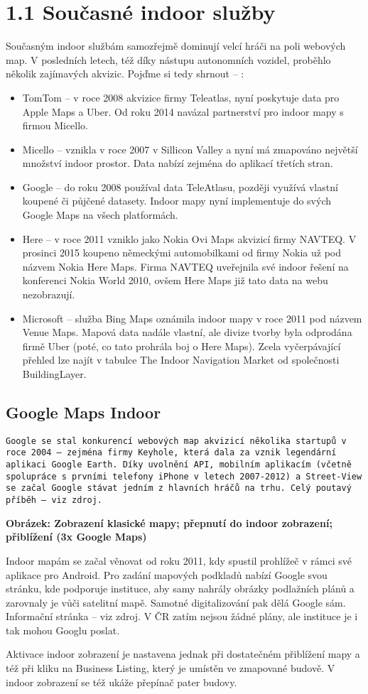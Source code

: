 \section{1.1 Současné indoor služby}
Současným indoor službám samozřejmě dominují velcí hráči na poli webových map. V posledních letech, též díky nástupu autonomních vozidel, proběhlo několik zajímavých akvizic. Pojďme si tedy shrnout – :
\begin{itemize}
\item TomTom – v roce 2008 akvizice firmy Teleatlas, nyní poskytuje data pro Apple Maps a Uber. Od roku 2014 navázal partnerství pro indoor mapy s firmou Micello. 
\item Micello – vznikla v roce 2007 v Sillicon Valley a nyní má zmapováno největší množství indoor prostor. Data nabízí zejména do aplikací třetích stran.
\item Google – do roku 2008 používal data TeleAtlasu, později využívá vlastní koupené či půjčené datasety. Indoor mapy nyní implementuje do svých Google Maps na všech platformách.
\item Here – v roce 2011 vzniklo jako Nokia Ovi Maps akvizicí firmy NAVTEQ. V prosinci 2015 koupeno německými automobilkami od firmy Nokia už pod názvem Nokia Here Maps. Firma NAVTEQ uveřejnila své indoor řešení na konferenci Nokia World 2010, ovšem Here Maps již tato data na webu nezobrazují. 
\item Microsoft – služba Bing Maps oznámila indoor mapy v roce 2011 pod názvem Venue Maps. Mapová data nadále vlastní, ale divize tvorby byla odprodána firmě Uber (poté, co tato prohrála boj o Here Maps).
Zcela vyčerpávající přehled lze najít v tabulce The Indoor Navigation Market od společnosti BuildingLayer.
\end{itemize}

\subsection*{Google Maps Indoor}
\texttt{Google se stal konkurencí webových map akvizicí několika startupů v roce 2004 – zejména firmy Keyhole, která dala za vznik legendární aplikaci Google Earth. Díky uvolnění API, mobilním aplikacím (včetně spolupráce s prvními telefony iPhone v letech 2007-2012) a Street-View se začal Google stávat jedním z hlavních hráčů na trhu. Celý poutavý příběh – viz zdroj.}


\textbf{Obrázek: Zobrazení klasické mapy; přepnutí do indoor zobrazení; přiblížení (3x Google Maps)}

Indoor mapám se začal věnovat od roku 2011, kdy spustil prohlížeč v rámci své aplikace pro Android. Pro zadání mapových podkladů nabízí Google svou stránku, kde podporuje instituce, aby samy nahrály obrázky podlažních plánů a zarovnaly je vůči satelitní mapě. Samotné digitalizování pak dělá Google sám. Informační stránka – viz zdroj. V ČR zatím nejsou žádné plány, ale instituce je i tak mohou Googlu poslat.

Aktivace indoor zobrazení je nastavena jednak při dostatečném přiblížení mapy a též při kliku na Business Listing, který je umístěn ve zmapované budově. V indoor zobrazení se též ukáže přepínač pater budovy. 